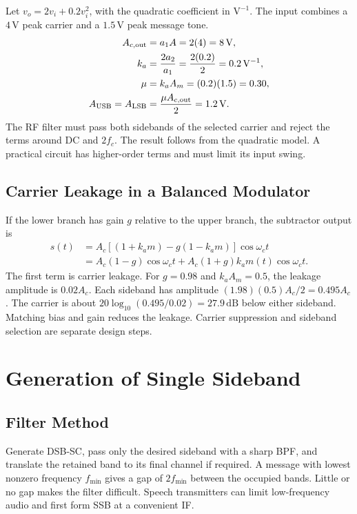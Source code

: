 \documentclass[12pt,a4paper]{article}
\begin{document}
\begin{tcolorbox}[examplebox, title={Square-Law Modulator with a Specified Carrier and Tone}]
Let $v_o=2v_i+0.2v_i^2$, with the quadratic coefficient in $\mathrm{V^{-1}}$. The input combines a $4\,\mathrm V$ peak carrier and a $1.5\,\mathrm V$ peak message tone.
\[
\begin{aligned}
 A_{c,\rm out} &= a_1A=2(4)=8\,\mathrm V,\\
 k_a &= \frac{2a_2}{a_1}=\frac{2(0.2)}{2}=0.2\,\mathrm{V^{-1}},\\
 \mu&=k_aA_m=(0.2)(1.5)=0.30,\\
 A_{\rm USB}=A_{\rm LSB}&=\frac{\mu A_{c,\rm out}}2=1.2\,\mathrm V.
\end{aligned}
\]
The RF filter must pass both sidebands of the selected carrier and reject the terms around DC and $2f_c$. The result follows from the quadratic model. A practical circuit has higher-order terms and must limit its input swing.
\end{tcolorbox}

\subsection{Carrier Leakage in a Balanced Modulator}
If the lower branch has gain $g$ relative to the upper branch, the subtractor output is
\[
\begin{aligned}
 s(t) &= A_c[(1+k_am)-g(1-k_am)]\cos\omega_ct\\
      &= A_c(1-g)\cos\omega_ct
        +A_c(1+g)k_am(t)\cos\omega_ct.
\end{aligned}
\]
The first term is carrier leakage. For $g=0.98$ and $k_aA_m=0.5$, the leakage amplitude is $0.02A_c$. Each sideband has amplitude $(1.98)(0.5)A_c/2=0.495A_c$. The carrier is about $20\log_{10}(0.495/0.02)=27.9\,\mathrm{dB}$ below either sideband. Matching bias and gain reduces the leakage. Carrier suppression and sideband selection are separate design steps.

\section{Generation of Single Sideband}
\subsection{Filter Method}
Generate DSB-SC, pass only the desired sideband with a sharp BPF, and translate the retained band to its final channel if required. A message with lowest nonzero frequency $f_{\min}$ gives a gap of $2f_{\min}$ between the occupied bands. Little or no gap makes the filter difficult. Speech transmitters can limit low-frequency audio and first form SSB at a convenient IF.
\end{document}
